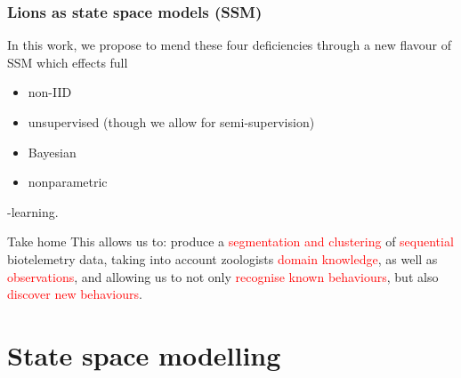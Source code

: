 \documentclass[aspectratio=169]{beamer}
\begin{document}

    \begin{frame}
        \frametitle{Lions as state space models (SSM)}

        In this work, we propose to mend these four deficiencies through a new flavour of SSM which effects full

        \begin{itemize}
            \item non-IID
            \item unsupervised (though we allow for semi-supervision)
            \item Bayesian
            \item nonparametric
        \end{itemize}
        -learning.

        \begin{block}{Take home}
            This allows us to: produce a \textcolor{red}{segmentation and clustering} of \textcolor{red}{sequential} biotelemetry data, taking into account zoologists \textcolor{red}{domain knowledge}, as well as \textcolor{red}{observations}, and allowing us to not only \textcolor{red}{recognise known behaviours}, but also \textcolor{red}{discover new behaviours}.
        \end{block}


    \end{frame}


    \section{State space modelling}
\end{document}
